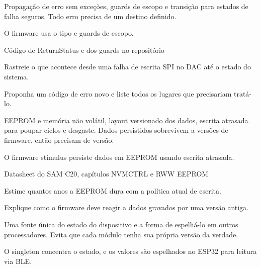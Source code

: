 Propagação de erro sem exceções, guards de escopo e transição para estados de falha seguros. Todo erro precisa de um destino definido.

\begin{noproduto}
O firmware usa o tipo  e guards de escopo.
\end{noproduto}

\begin{paraestudar}
  \item Código de ReturnStatus e dos guards no repositório
\end{paraestudar}

\begin{pratique}
  \item Rastreie o que acontece desde uma falha de escrita SPI no DAC até o estado do sistema.
  \item Proponha um código de erro novo e liste todos os lugares que precisariam tratá-lo.
\end{pratique}

EEPROM e memória não volátil, layout versionado dos dados, escrita atrasada para poupar ciclos e desgaste. Dados persistidos sobrevivem a versões de firmware, então precisam de versão.

\begin{noproduto}
O firmware stimulus persiste dados em EEPROM usando escrita atrasada.
\end{noproduto}

\begin{paraestudar}
  \item Datasheet do SAM C20, capítulos NVMCTRL e RWW EEPROM
\end{paraestudar}

\begin{pratique}
  \item Estime quantos anos a EEPROM dura com a política atual de escrita.
  \item Explique como o firmware deve reagir a dados gravados por uma versão antiga.
\end{pratique}

Uma fonte única do estado do dispositivo e a forma de espelhá-lo em outros processadores. Evita que cada módulo tenha sua própria versão da verdade.

\begin{noproduto}
O singleton  concentra o estado, e os valores são espelhados no ESP32 para leitura via BLE.
\end{noproduto}

